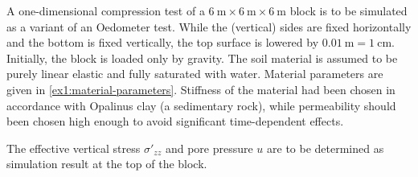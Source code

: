 A one-dimensional compression test of a
$\SI{6}{\metre} \times \SI{6}{\metre} \times \SI{6}{\metre}$ block is to be
simulated as a variant of an Oedometer test. While the (vertical) sides are
fixed horizontally and the bottom is fixed vertically, the top surface is
lowered by $\SI{0.01}{\metre}=\SI{1}{\centi\metre}$. Initially, the block is
loaded only by gravity. The soil material is assumed to be purely linear
elastic and fully saturated with water. Material parameters are given in
\autoref{ex1:material-parameters}. Stiffness of the material had been chosen
in accordance with Opalinus clay (a sedimentary rock), while permeability
should been chosen high enough to avoid significant time-dependent effects.

The effective vertical stress $\sigma'_{zz}$ and pore pressure $u$ are to be
determined as simulation result at the top of the block.

